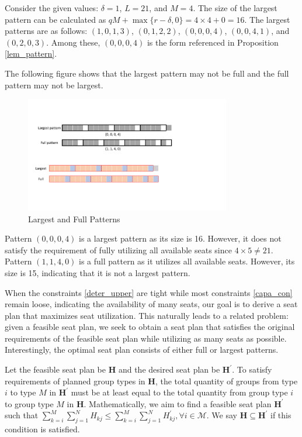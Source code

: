\begin{example}
Consider the given values: $\delta = 1$, $L = 21$, and $M = 4$. The size of the largest pattern can be calculated as $qM + \max\{r-\delta, 0\} = 4 \times 4 + 0 = 16$. The largest patterns are as follows: $(1, 0, 1, 3)$, $(0, 1, 2, 2)$, $(0, 0, 0, 4)$, $(0, 0, 4, 1)$, and $(0, 2, 0, 3)$. Among these, $(0, 0, 0, 4)$ is the form referenced in Proposition \ref{lem_pattern}.

The following figure shows that the largest pattern may not be full and the full pattern may not be largest.
\begin{figure}[ht]
    \centering
        \includegraphics[width=0.8\textwidth]{./Figures/largest_full.pdf}
    \caption{Largest and Full Patterns}
\end{figure}

Pattern $(0, 0, 0, 4)$ is a largest pattern as its size is 16. However, it does not satisfy the requirement of fully utilizing all available seats since $4 \times 5 \neq 21$. Pattern $(1, 1, 4, 0)$ is a full pattern as it utilizes all available seats. However, its size is 15, indicating that it is not a largest pattern.
\end{example}

When the constraints \eqref{deter_upper} are tight while most constraints \eqref{capa_con} remain loose, indicating the availability of many seats, our goal is to derive a seat plan that maximizes seat utilization. This naturally leads to a related problem: given a feasible seat plan, we seek to obtain a seat plan that satisfies the original requirements of the feasible seat plan while utilizing as many seats as possible. Interestingly, the optimal seat plan consists of either full or largest patterns.


Let the feasible seat plan be $\bm{H}$ and the desired seat plan be $\bm{H}^{\prime}$. To satisfy requirements of planned group types in $\bm{H}$, the total quantity of groups from type $i$ to type $M$ in $\bm{H}^{\prime}$ must be at least equal to the total quantity from group type $i$ to group type $M$ in $\bm{H}$. Mathematically, we aim to find a feasible seat plan $\bm{H}^{\prime}$ such that $\sum_{k=i}^{M} \sum_{j=1}^{N} H_{kj} \leq \sum_{k=i}^{M} \sum_{j=1}^{N} H^{\prime}_{kj}, \forall i \in \mathcal{M}$. We say $\bm{H} \subseteq \bm{H}^{\prime}$ if this condition is satisfied.

